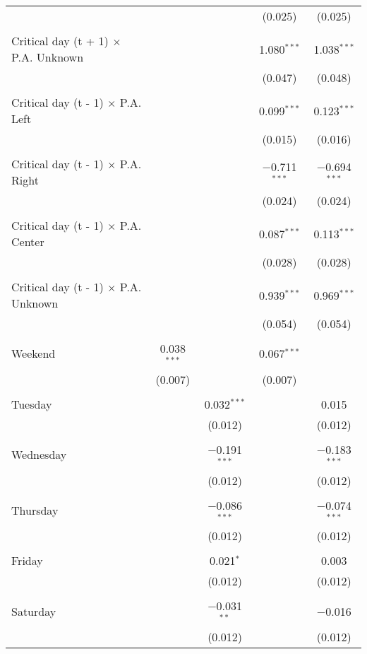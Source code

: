 \documentclass[
]{article}
\begin{document}
\begin{table}[!htbp]
{\begin{tabular}{@{\extracolsep{5pt}}lcccc}
  &  &  & (0.025) & (0.025) \\ 
  & & & & \\ 
 Critical day (t + 1) $\times$ P.A. Unknown &  &  & 1.080$^{***}$ & 1.038$^{***}$ \\ 
  &  &  & (0.047) & (0.048) \\ 
  & & & & \\ 
 Critical day (t - 1) $\times$ P.A. Left &  &  & 0.099$^{***}$ & 0.123$^{***}$ \\ 
  &  &  & (0.015) & (0.016) \\ 
  & & & & \\ 
 Critical day (t - 1) $\times$ P.A. Right &  &  & $-$0.711$^{***}$ & $-$0.694$^{***}$ \\ 
  &  &  & (0.024) & (0.024) \\ 
  & & & & \\ 
 Critical day (t - 1) $\times$ P.A. Center &  &  & 0.087$^{***}$ & 0.113$^{***}$ \\ 
  &  &  & (0.028) & (0.028) \\ 
  & & & & \\ 
 Critical day (t - 1) $\times$ P.A. Unknown &  &  & 0.939$^{***}$ & 0.969$^{***}$ \\ 
  &  &  & (0.054) & (0.054) \\ 
  & & & & \\ 
 Weekend & 0.038$^{***}$ &  & 0.067$^{***}$ &  \\ 
  & (0.007) &  & (0.007) &  \\ 
  & & & & \\ 
 Tuesday &  & 0.032$^{***}$ &  & 0.015 \\ 
  &  & (0.012) &  & (0.012) \\ 
  & & & & \\ 
 Wednesday &  & $-$0.191$^{***}$ &  & $-$0.183$^{***}$ \\ 
  &  & (0.012) &  & (0.012) \\ 
  & & & & \\ 
 Thursday &  & $-$0.086$^{***}$ &  & $-$0.074$^{***}$ \\ 
  &  & (0.012) &  & (0.012) \\ 
  & & & & \\ 
 Friday &  & 0.021$^{*}$ &  & 0.003 \\ 
  &  & (0.012) &  & (0.012) \\ 
  & & & & \\ 
 Saturday &  & $-$0.031$^{**}$ &  & $-$0.016 \\ 
  &  & (0.012) &  & (0.012) \\ 

\end{tabular}}
\end{table}
\end{document}
